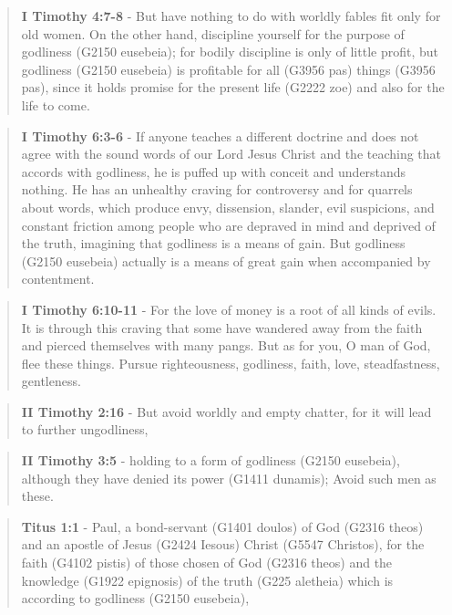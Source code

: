 \documentclass[11pt]{article}
\begin{document}
\begin{quote}
\textbf{I Timothy 4:7-8} - But have nothing to do with worldly fables fit only for old women. On the other hand, discipline yourself for the purpose of godliness (G2150 eusebeia); for bodily discipline is only of little profit, but godliness (G2150 eusebeia) is profitable for all (G3956 pas) things (G3956 pas), since it holds promise for the present life (G2222 zoe) and also for the life to come.
\end{quote}

\begin{quote}
\textbf{I Timothy 6:3-6} - If anyone teaches a different doctrine and does not agree with the sound words of our Lord Jesus Christ and the teaching that accords with godliness, he is puffed up with conceit and understands nothing. He has an unhealthy craving for controversy and for quarrels about words, which produce envy, dissension, slander, evil suspicions, and constant friction among people who are depraved in mind and deprived of the truth, imagining that godliness is a means of gain. But godliness (G2150 eusebeia) actually is a means of great gain when accompanied by contentment.
\end{quote}

\begin{quote}
\textbf{I Timothy 6:10-11} - For the love of money is a root of all kinds of evils. It is through this craving that some have wandered away from the faith and pierced themselves with many pangs. But as for you, O man of God, flee these things. Pursue righteousness, godliness, faith, love, steadfastness, gentleness.
\end{quote}

\begin{quote}
\textbf{II Timothy 2:16} - But avoid worldly and empty chatter, for it will lead to further ungodliness,
\end{quote}

\begin{quote}
\textbf{II Timothy 3:5} - holding to a form of godliness (G2150 eusebeia), although they have denied its power (G1411 dunamis); Avoid such men as these.
\end{quote}

\begin{quote}
\textbf{Titus 1:1} - Paul, a bond-servant (G1401 doulos) of God (G2316 theos) and an apostle of Jesus (G2424 Iesous) Christ (G5547 Christos), for the faith (G4102 pistis) of those chosen of God (G2316 theos) and the knowledge (G1922 epignosis) of the truth (G225 aletheia) which is according to godliness (G2150 eusebeia),
\end{quote}
\end{document}
